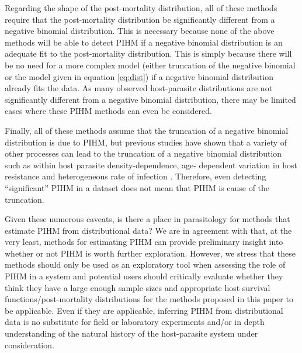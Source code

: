 \documentclass[12pt, a4paper]{article}
\begin{document}
Regarding the shape of the post-mortality distribution, all of these methods
require that the post-mortality distribution be significantly different from a
negative binomial distribution.  This is necessary because none of the above
methods will be able to detect PIHM if a negative binomial distribution is an
adequate fit to the post-mortality distribution.  This is simply because there will be no need for a more complex model (either truncation of the negative binomial or the model given in equation \ref{eq:dist}) if a negative binomial distribution already fits the data. As many
observed host-parasite distributions are not significantly different from a
negative binomial distribution, there may be limited cases where these PIHM methods
can even be considered.

Finally, all of these methods assume that the truncation of a negative binomial
distribution is due to PIHM, but previous studies have shown that a variety of other processes can lead to the truncation of a negative
binomial distribution such as within host parasite density-dependence, age-
dependent variation in host resistance and heterogeneous rate of infection
\citep{McCallum2000a,Anderson1982a,Rousset1996}.  Therefore, even detecting ``significant'' PIHM in a
dataset does not mean that PIHM is cause of the truncation.

Given these numerous caveats, is there a place in parasitology for methods that
estimate PIHM from distributional data?  We are in agreement with
\cite{Lester1984} that, at the very least, methods for estimating PIHM can
provide preliminary insight into whether or not PIHM is worth further
exploration.  However, we stress that these methods should only be used as an
exploratory tool when assessing the role of PIHM in a system and potential
users should critically evaluate whether they think they have a large enough
sample sizes and appropriate host survival functions/post-mortality distributions for the methods proposed
in this paper to be applicable.  Even if they are applicable, inferring PIHM
from distributional data is no substitute for field or laboratory experiments
and/or in depth understanding of the natural history of the host-parasite
system under consideration.


\singlespacing


\end{document}
